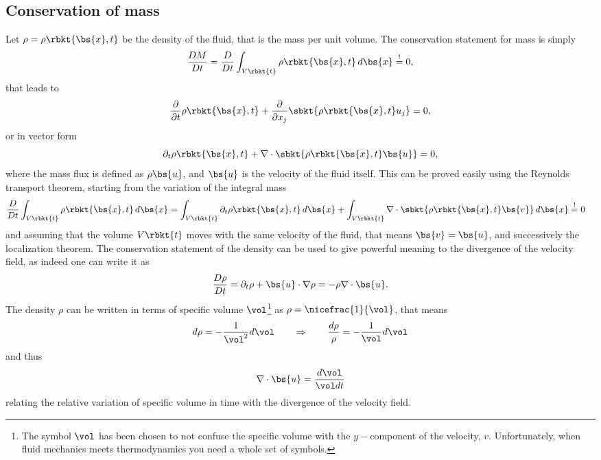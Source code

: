 \subsection{Conservation of mass}
Let $\rho=\rho\rbkt{\bs{x},t}$ be the density of the fluid, that is the mass per unit volume. The conservation statement for mass is simply 
\begin{equation}
    \dfrac{DM}{Dt} = \dfrac{D}{Dt}\int_{V\rbkt{t}}\rho\rbkt{\bs{x},t}\,d\bs{x} \stackrel{!}{=} 0,
\end{equation}
that leads to
\begin{equation}
    \dfrac{\partial}{\partial t}\rho\rbkt{\bs{x},t} + \dfrac{\partial}{\partial x_{j}}\sbkt{\rho\rbkt{\bs{x},t}u_{j} } = 0,
\end{equation}
or in vector form
\begin{equation}\label{eq:differential_conservation_mass}
    \partial_{t}\rho\rbkt{\bs{x},t} + \nabla\cdot\sbkt{\rho\rbkt{\bs{x},t}\bs{u} } = 0,
\end{equation}
where the mass flux is defined as $\rho\bs{u}$, and $\bs{u}$ is the velocity of the fluid itself. This can be proved easily using the Reynolds transport theorem, starting from the variation of the integral mass
\begin{align}
    \dfrac{D}{Dt}\int_{V\rbkt{t}}\rho\rbkt{\bs{x},t}\,d\bs{x} & =
    \int_{V\rbkt{t}} \partial_{t}\rho\rbkt{\bs{x},t}\,d\bs{x} + \int_{V\rbkt{t}} \nabla\cdot\sbkt{\rho\rbkt{\bs{x},t}\bs{v}}\,d\bs{x}\stackrel{!}{=} 0
\end{align}
and assuming that the volume $V\rbkt{t}$ moves with the same velocity of the fluid, that means $\bs{v}=\bs{u}$, and successively the localization theorem.
The conservation statement of the density can be used to give powerful meaning to the divergence of the velocity field, as indeed one can write it as
\begin{equation}\label{eq:continuity_2}
    \dfrac{D\rho}{Dt} = \partial_{t}\rho + \bs{u}\cdot\nabla\rho = -\rho\nabla\cdot\bs{u}.
\end{equation}
The density $\rho$ can be written in terms of specific volume $\vol$\footnote{The symbol $\vol$ has been chosen to not confuse the specific volume with the $y-$component of the velocity, $v$. Unfortunately, when fluid mechanics meets thermodynamics you need a whole set of symbols.} as $\rho=\nicefrac{1}{\vol}$, that means
\begin{equation*}
    d\rho=-\frac{1}{\vol^{2}}d{\vol} \qquad \Rightarrow \qquad \dfrac{d\rho}{\rho}=-\frac{1}{\vol}d\vol
\end{equation*}
and thus
\begin{equation}
    \nabla\cdot\bs{u} = \frac{d\vol}{\vol dt}
\end{equation}
relating the relative variation of specific volume in time with the divergence of the velocity field.
